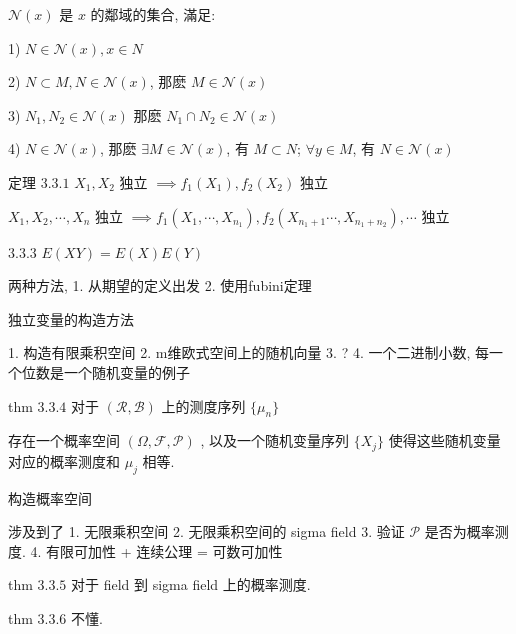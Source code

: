 \documentclass[a4paper, 10pt]{ctexbook} %
\begin{document}
$\mathcal N \left(x\right)$ 是 $x$ 的鄰域的集合, 滿足:

1) $N\in \mathcal N\left(x\right) , x \in N$

2) $N \subset M, N \in \mathcal N \left(x\right)$, 那麽 $M \in \mathcal N \left(x\right)$

3) $N_{1}, N_{2} \in \mathcal N \left(x\right)$ 那麽 $N_{1} \cap N_{2} \in \mathcal N \left(x\right)$

4) $N \in \mathcal N \left(x\right)$, 那麽 $\exists M \in \mathcal N \left(x\right)$, 有 $M \subset N$; $\forall y \in M$, 有 $N\in \mathcal N \left(x\right)$


定理 $3.3.1$ $X_{1}  ,X_{2}$ 独立 $\implies f_1\left(X_{1}\right) , f_{2} \left(X_{2}\right)$ 独立

$X_{1} , X_{2} , \cdots  , X_{n}$ 独立  $\implies f_{1}\left(X_{1} , \cdots  , X_{n_{1}}\right) , f_{2} \left(X_{n_1 + 1} \cdots  , X_{n_1 + n_2}\right) ,\cdots $ 独立

$3.3.3$ $E \left(X Y\right) = E\left(X\right) E \left(Y\right)$

两种方法, 1. 从期望的定义出发 2. 使用fubini定理

独立变量的构造方法

1. 构造有限乘积空间
2. m维欧式空间上的随机向量
3. ?
4. 一个二进制小数, 每一个位数是一个随机变量的例子

thm $3.3.4$ 对于 $\left( \mathscr R, \mathscr B\right)$ 上的测度序列 $\{ \mu_{n} \}$

存在一个概率空间 $\left(\Omega , \mathscr F , \mathscr P\right)$ , 以及一个随机变量序列 $\{ X_{j}\}$ 使得这些随机变量对应的概率测度和 $\mu_{j}$ 相等. 

构造概率空间

涉及到了 1. 无限乘积空间 2. 无限乘积空间的 sigma field 3. 验证 $\mathscr P $ 是否为概率测度. 
4. 有限可加性 + 连续公理 = 可数可加性

thm $3.3.5$ 对于 field 到 sigma field 上的概率测度. 

thm $3.3.6$ 不懂. 
\end{document}
